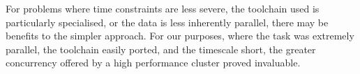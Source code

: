For problems where time constraints are less severe, the toolchain used is particularly specialised, or the data is less inherently parallel, there may be benefits to the simpler approach.  For our purposes, where the task was extremely parallel, the toolchain easily ported, and the timescale short, the greater concurrency offered by a high performance cluster proved invaluable.  











% 
% 
% 
% 
% 
% 
% 
% 
